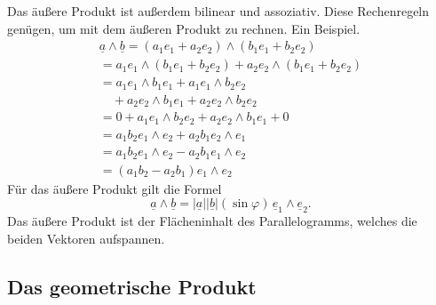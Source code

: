 \documentclass[a4paper,10pt,fleqn,twocolumn,twoside]{article}
\begin{document}
Das äußere Produkt ist außerdem bilinear und assoziativ.
Diese Rechenregeln genügen, um mit dem äußeren Produkt zu rechnen.
Ein Beispiel.
\begin{gather*}
\underline a\wedge\underline b
= (a_1e_1+a_2e_2) \wedge (b_1e_1+b_2e_2)\\
= a_1e_1\wedge (b_1e_1+b_2e_2) + a_2e_2\wedge (b_1e_1+b_2e_2)\\
= a_1e_1\wedge b_1e_1+a_1e_1\wedge b_2e_2\\
\quad + a_2e_2\wedge b_1e_1+a_2e_2\wedge b_2e_2\\
= 0+a_1e_1\wedge b_2e_2 + a_2e_2\wedge b_1e_1+0\\
= a_1b_2e_1\wedge e_2 + a_2b_1 e_2\wedge e_1\\
= a_1b_2e_1\wedge e_2 - a_2b_1 e_1\wedge e_2\\
= (a_1b_2-a_2b_1)e_1\wedge e_2
\end{gather*}
\noindent
Für das äußere Produkt gilt die Formel
\[\underline a\wedge\underline b= |\underline a||\underline b|
(\sin\varphi)\,\underline e_1\wedge\underline e_2.\]
\noindent
Das äußere Produkt ist der Flächeninhalt des Parallelogramms,
welches die beiden Vektoren aufspannen.

\subsection{Das geometrische Produkt}
\end{document}
